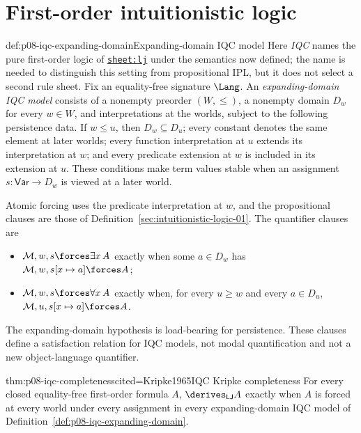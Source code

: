 \section{First-order intuitionistic logic}

\begin{hbdefinition}{def:p08-iqc-expanding-domain}{Expanding-domain IQC model}
Here \emph{IQC} names the pure first-order logic of
\hyperref[sheet:lj]{\texttt{sheet:lj}} under the semantics now defined; the
name is needed to distinguish this setting from propositional IPL, but it does
not select a second rule sheet.  Fix an equality-free signature \(\Lang\).
An \emph{expanding-domain IQC model} consists of a nonempty preorder
\((W,\leq)\), a nonempty domain \(D_w\) for every \(w\in W\), and
interpretations at the worlds, subject to the following persistence data.
If \(w\leq u\), then \(D_w\subseteq D_u\); every constant denotes the same
element at later worlds; every function interpretation at \(u\) extends its
interpretation at \(w\); and every predicate extension at \(w\) is included in
its extension at \(u\).  These conditions make term values stable when an
assignment \(s:\mathsf{Var}\to D_w\) is viewed at a later world.

Atomic forcing uses the predicate interpretation at \(w\), and the
propositional clauses are those of
Definition~\ref{sec:intuitionistic-logic-01}.  The quantifier clauses are

\begin{itemize}
\item \(\mathcal M,w,s\forces\exists x\,A\) exactly when some
  \(a\in D_w\) has
  \(\mathcal M,w,s[x\mapsto a]\forces A\);
\item \(\mathcal M,w,s\forces\forall x\,A\) exactly when, for every
  \(u\geq w\) and every \(a\in D_u\),
  \(\mathcal M,u,s[x\mapsto a]\forces A\).
\end{itemize}

The expanding-domain hypothesis is load-bearing for persistence.  These
clauses define a satisfaction relation for IQC models, not modal
quantification and not a new object-language quantifier.
\end{hbdefinition}

\begin{hbtheorem}{thm:p08-iqc-completeness}{cited=Kripke1965}{IQC Kripke completeness}
For every closed equality-free first-order formula \(A\),
\(\derives_{\mathsf{LJ}}A\) exactly when \(A\) is forced at every world under
every assignment in every expanding-domain IQC model of
Definition~\ref{def:p08-iqc-expanding-domain}.
\end{hbtheorem}

